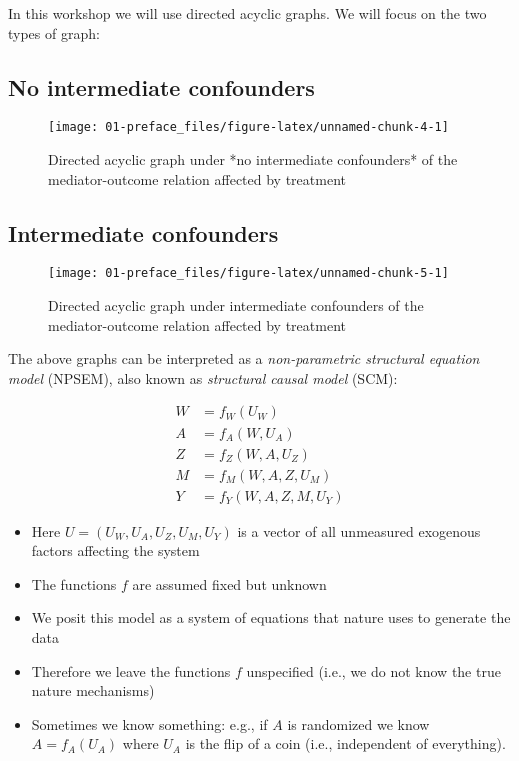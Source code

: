 \documentclass[
  12pt,
]{book}
\providecommand{\tightlist}{%
  \setlength{\itemsep}{0pt}\setlength{\parskip}{0pt}}
\theoremstyle{definition}
\theoremstyle{definition}
\theoremstyle{definition}
\newcommand{\1}{\mathbbm{1}}
\begin{document}
In this workshop we will use directed acyclic graphs. We will focus on the two
types of graph:

\hypertarget{no-intermediate-confounders}{%
\subsection{No intermediate confounders}\label{no-intermediate-confounders}}

\begin{figure}

{\centering \texttt{[image: 01-preface\_files/figure-latex/unnamed-chunk-4-1]} 

}

\caption{Directed acyclic graph under *no intermediate confounders* of the mediator-outcome relation affected by treatment}\label{fig:unnamed-chunk-4}
\end{figure}

\hypertarget{intermediate-confounders}{%
\subsection{Intermediate confounders}\label{intermediate-confounders}}

\begin{figure}

{\centering \texttt{[image: 01-preface\_files/figure-latex/unnamed-chunk-5-1]} 

}

\caption{Directed acyclic graph under intermediate confounders of the mediator-outcome relation affected by treatment}\label{fig:unnamed-chunk-5}
\end{figure}

The above graphs can be interpreted as a \emph{non-parametric structural equation model}
(NPSEM), also known as \emph{structural causal model} (SCM):

\begin{align}
  W & = f_W(U_W)\\
  A & = f_A(W, U_A)\\
  Z & = f_Z(W, A, U_Z)\\
  M & = f_M(W, A, Z, U_M)\\
  Y & = f_Y(W, A, Z, M, U_Y)
\end{align}

\begin{itemize}
\tightlist
\item
  Here \(U=(U_W, U_A, U_Z, U_M, U_Y)\) is a vector of all unmeasured exogenous
  factors affecting the system
\item
  The functions \(f\) are assumed fixed but unknown
\item
  We posit this model as a system of equations that nature uses to generate the
  data
\item
  Therefore we leave the functions \(f\) unspecified (i.e., we do not know the
  true nature mechanisms)
\item
  Sometimes we know something: e.g., if \(A\) is randomized we know \(A=f_A(U_A)\)
  where \(U_A\) is the flip of a coin (i.e., independent of everything).
\end{itemize}
\end{document}
